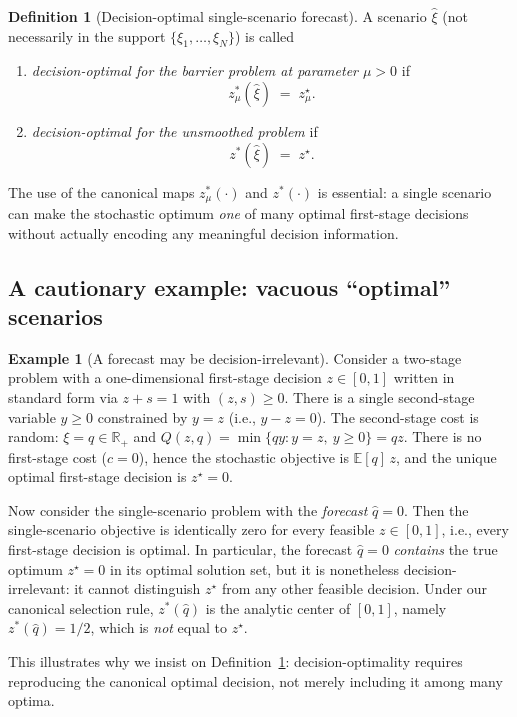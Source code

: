 \documentclass[11pt]{article}
\theoremstyle{plain}
\theoremstyle{definition}
\newtheorem{definition}[theorem]{Definition}
\newtheorem{example}[theorem]{Example}
\theoremstyle{remark}
\newcommand{\R}{\mathbb{R}}
\newcommand{\E}{\mathbb{E}}
\begin{document}
\begin{definition}[Decision-optimal single-scenario forecast]\label{def:dosf}
A scenario $\hat\xi$ (not necessarily in the support $\{\xi_1,\dots,\xi_N\}$) is called
\begin{enumerate}[leftmargin=2.2em]
\item \emph{decision-optimal for the barrier problem at parameter $\mu>0$} if
\[
  z_\mu^*(\hat\xi)\;=\;z_\mu^\star.
\]
\item \emph{decision-optimal for the unsmoothed problem} if
\[
  z^*(\hat\xi)\;=\;z^\star.
\]
\end{enumerate}
\end{definition}

The use of the canonical maps $z_\mu^*(\cdot)$ and $z^*(\cdot)$ is essential: a single scenario can make the
stochastic optimum \emph{one} of many optimal first-stage decisions without actually encoding any meaningful
decision information.

\subsection{A cautionary example: vacuous ``optimal'' scenarios}\label{subsec:vacuous}

\begin{example}[A forecast may be decision-irrelevant]\label{ex:vacuous}
Consider a two-stage problem with a one-dimensional first-stage decision $z\in[0,1]$ written in standard
form via $z+s=1$ with $(z,s)\ge 0$.  There is a single second-stage variable $y\ge 0$ constrained by $y=z$
(i.e., $y-z=0$).  The second-stage cost is random: $\xi=q\in\R_+$ and $Q(z,q)=\min\{qy: y=z,\ y\ge 0\}=qz$.
There is no first-stage cost ($c=0$), hence the stochastic objective is $\E[q]\,z$, and the unique optimal
first-stage decision is $z^\star=0$.

Now consider the single-scenario problem with the \emph{forecast} $\hat q=0$.  Then the single-scenario
objective is identically zero for every feasible $z\in[0,1]$, i.e., every first-stage decision is optimal.
In particular, the forecast $\hat q=0$ \emph{contains} the true optimum $z^\star=0$ in its optimal solution set,
but it is nonetheless decision-irrelevant: it cannot distinguish $z^\star$ from any other feasible decision.
Under our canonical selection rule, $z^*(\hat q)$ is the analytic center of $[0,1]$, namely $z^*(\hat q)=1/2$,
which is \emph{not} equal to $z^\star$.

This illustrates why we insist on Definition~\ref{def:dosf}: decision-optimality requires reproducing the
canonical optimal decision, not merely including it among many optima.
\end{example}
\end{document}
